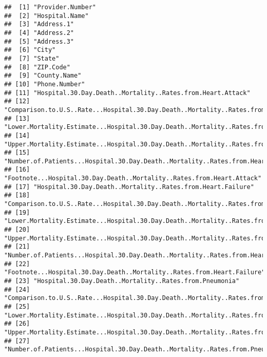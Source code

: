 \documentclass[]{article}
\begin{document}
\begin{verbatim}
##  [1] "Provider.Number"                                                                      
##  [2] "Hospital.Name"                                                                        
##  [3] "Address.1"                                                                            
##  [4] "Address.2"                                                                            
##  [5] "Address.3"                                                                            
##  [6] "City"                                                                                 
##  [7] "State"                                                                                
##  [8] "ZIP.Code"                                                                             
##  [9] "County.Name"                                                                          
## [10] "Phone.Number"                                                                         
## [11] "Hospital.30.Day.Death..Mortality..Rates.from.Heart.Attack"                            
## [12] "Comparison.to.U.S..Rate...Hospital.30.Day.Death..Mortality..Rates.from.Heart.Attack"  
## [13] "Lower.Mortality.Estimate...Hospital.30.Day.Death..Mortality..Rates.from.Heart.Attack" 
## [14] "Upper.Mortality.Estimate...Hospital.30.Day.Death..Mortality..Rates.from.Heart.Attack" 
## [15] "Number.of.Patients...Hospital.30.Day.Death..Mortality..Rates.from.Heart.Attack"       
## [16] "Footnote...Hospital.30.Day.Death..Mortality..Rates.from.Heart.Attack"                 
## [17] "Hospital.30.Day.Death..Mortality..Rates.from.Heart.Failure"                           
## [18] "Comparison.to.U.S..Rate...Hospital.30.Day.Death..Mortality..Rates.from.Heart.Failure" 
## [19] "Lower.Mortality.Estimate...Hospital.30.Day.Death..Mortality..Rates.from.Heart.Failure"
## [20] "Upper.Mortality.Estimate...Hospital.30.Day.Death..Mortality..Rates.from.Heart.Failure"
## [21] "Number.of.Patients...Hospital.30.Day.Death..Mortality..Rates.from.Heart.Failure"      
## [22] "Footnote...Hospital.30.Day.Death..Mortality..Rates.from.Heart.Failure"                
## [23] "Hospital.30.Day.Death..Mortality..Rates.from.Pneumonia"                               
## [24] "Comparison.to.U.S..Rate...Hospital.30.Day.Death..Mortality..Rates.from.Pneumonia"     
## [25] "Lower.Mortality.Estimate...Hospital.30.Day.Death..Mortality..Rates.from.Pneumonia"    
## [26] "Upper.Mortality.Estimate...Hospital.30.Day.Death..Mortality..Rates.from.Pneumonia"    
## [27] "Number.of.Patients...Hospital.30.Day.Death..Mortality..Rates.from.Pneumonia"          

\end{verbatim}
\end{document}
